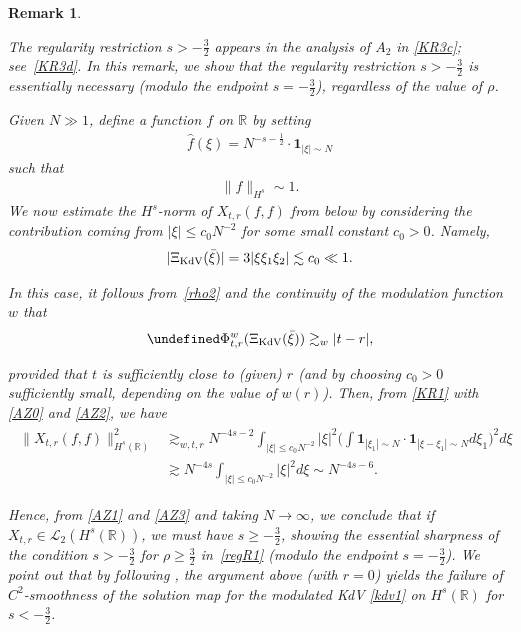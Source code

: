 \documentclass[letterpaper, 11pt,  reqno]{amsart}
\newtheorem{remark}[theorem]{Remark}
\DeclareMathOperator*{\intt}{\int}
\newcommand{\1}{\hspace{0.5mm}\text{I}\hspace{0.5mm}}
\newcommand{\noi}{\noindent}
\newcommand{\R}{\mathbb{R}}
\let\Re=\undefined\DeclareMathOperator*{\Re}{Re}
\renewcommand{\L}{\mathcal{L}}
\newcommand{\ft}{\widehat}
\newcommand{\les}{\lesssim}
\newcommand{\ges}{\gtrsim}
\newcommand{\ind}{\mathbf 1}
\newcommand{\KDV}{\text{\rm KdV} }
\numberwithin{equation}{section}
\numberwithin{theorem}{section}
\begin{document}
\begin{remark} \label{REM:low1} \rm


The regularity restriction $s > - \frac 32$
appears in the analysis of $A_2$ in \eqref{KR3c}; 
see~\eqref{KR3d}.
In this remark, we show that 
the regularity restriction $s > - \frac 32$ is essentially necessary
(modulo the endpoint $s = -\frac 32$), 
regardless of the value of $\rho$.

Given $N \gg 1$, define a function $f$ on $\R$ by setting
\begin{align}
\ft f(\xi) = N^{-s-\frac 12} \cdot \ind_{|\xi|\sim N}
\label{AZ0}
\end{align}
such that 
\begin{align}
\| f \|_{H^s} \sim 1.
\label{AZ1}
\end{align}
We now estimate the $H^s$-norm
of $X_{t,r} (f,f)$ from below
by considering the contribution coming from $|\xi| \le c_0 N^{-2}$
for some small constant $c_0 > 0$.
Namely, 
\begin{align}
|\Xi_\KDV (\bar \xi)|
= 3|\xi \xi_1\xi_2|\les c_0 \ll 1.
\label{AZ1a}
\end{align}

\noi
In this case, it follows from~\eqref{rho2}
and the continuity of the modulation function $w$
that 
\begin{align}
\Re \Phi^w_{t,r}(\Xi_\KDV(\bar \xi))
\ges_w  |t-r|,
\label{AZ2}
\end{align}


\noi
provided that $t$ is sufficiently close to (given) $r$
(and by choosing $c_0 > 0$ sufficiently small, depending on the value of $w(r)$).
Then, from \eqref{KR1} with \eqref{AZ0} and \eqref{AZ2}, we have 
\begin{align}
\begin{split}
\| X_{t,r} (f,f)\|_{H^s(\R)}^2 
& \ges_{w, t, r}
N^{-4s-2} 
 \intt_{|\xi| \le c_0 N^{-2}}
|\xi|^2 
\bigg(\int
\ind_{|\xi_1|\sim N} \cdot \ind_{|\xi-\xi_1|\sim N}
d\xi_1\bigg)^2 d\xi \\
& \ges
N^{-4s} 
 \intt_{|\xi| \le c_0 N^{-2}}
|\xi|^2 
 d\xi 
\sim  
N^{-4s-6}. 
\end{split}
\label{AZ3}
\end{align}


\noi
Hence, from \eqref{AZ1} and \eqref{AZ3}
and taking $N \to \infty$, 
we conclude that if $X_{t, r} \in \L_2(H^s(\R))$, we must have $s \ge - \frac 32$, 
showing the essential sharpness 
of the condition $s > - \frac 32$ for $\rho \ge \frac 32$ in~\eqref{regR1}
(modulo the endpoint $s = -\frac 32$).
We point out that by following
\cite[Section~6]{BO97}, 
the argument above (with $r = 0$) yields the failure of $C^2$-smoothness
of the solution map for the modulated KdV \eqref{kdv1} on $H^s(\R)$
for $s < -\frac 32$.



\end{remark}
\end{document}
